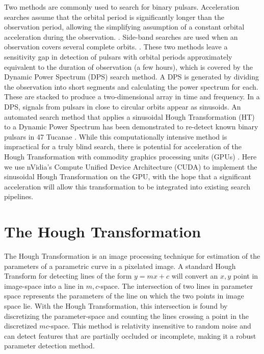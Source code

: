 Two methods are commonly used to search for binary pulsars.
Acceleration searches assume that the orbital period is significantly longer than the observation period, allowing the simplifying assumption of a constant orbital acceleration during the observation. \citep{camilo2000observations,ransom2002fourier, Ransom2001a}.
Side-band searches are used when an observation covers several complete orbits. \citep{Jouteux2002a, Ransom2003}.
These two methods leave a sensitivity gap in detection of pulsars with orbital periods approximately equivalent to the duration of observation (a few hours), which is covered by the Dynamic Power Spectrum (DPS) search method.
A DPS is generated by dividing the observation into short segments and calculating the power spectrum for each.
These are stacked to produce a two-dimensional array in time and frequency. In a DPS, signals from pulsars in close to circular orbits appear as sinusoids.
An automated search method that applies a sinusoidal Hough Transformation (HT) to a Dynamic Power Spectrum has been demonstrated to re-detect known binary pulsars in 47 Tucanae \citep{aulbert2005finding, aulbert2007finding}.
While this computationally intensive method is impractical for a truly blind search, there is potential for acceleration of the Hough Transformation with commodity graphics processing units (GPUs) \citep{aulbert2005finding}.
Here we use nVidia's Compute Unified Device Architecture (CUDA) to implement the sinusoidal Hough Transformation on the GPU, with the hope that a significant acceleration will allow this transformation to be integrated into existing search pipelines.

\section{The Hough Transformation}

The Hough Transformation is an image processing technique for estimation of the parameters of a parametric curve in a pixelated image.
A standard Hough Transform for detecting lines of the form $y=mx+c$ will convert an $x,y$ point in image-space into a line in $m,c$-space.
The intersection of two lines in parameter space represents the parameters of the line on which the two points in image space lie.
With the Hough Transformation, this intersection is found by discretizing the parameter-space and counting the lines crossing a point in the discretized $mc$-space.
This method is relativity insensitive to random noise and can detect features that are partially occluded or incomplete, making it a robust parameter detection method.

